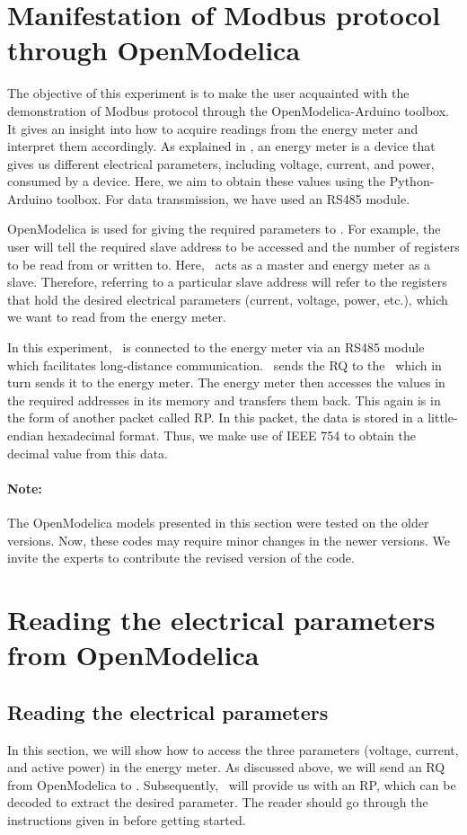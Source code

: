
\section{Manifestation of Modbus protocol through OpenModelica}
The objective of this experiment is to make the user acquainted with
the demonstration of Modbus protocol through the OpenModelica-Arduino toolbox.
It gives an insight into how to acquire readings from the energy meter and interpret them accordingly. As explained in ,
an energy meter is a device that gives us different electrical parameters, including voltage, current, and power, consumed by a device. Here, we aim to obtain these values using the Python-Arduino toolbox. For data transmission, we have used an RS485 module.

OpenModelica is used for giving the required parameters to \arduino. For
example, the user will tell the required slave address to be accessed
and the number of registers to be read from or written to. Here,
\arduino\ acts as a master and energy meter as a slave. Therefore,
referring to a particular slave address will refer to the registers
that hold the desired electrical parameters (current, voltage, power, etc.), which we want to read from the energy meter.

In this experiment, \arduino\ is connected to the energy meter via an RS485 module which facilitates long-distance communication.
\scilab\ sends the RQ to the \arduino\, which in turn sends it to the
energy meter. The energy meter then accesses the values in the
required addresses in its memory and transfers them back. This again
is in the form of another packet called RP. In this packet, the data is stored in a little-endian hexadecimal format. Thus, we make use of IEEE 754 to obtain the decimal value from this data.

\paragraph{Note: } The OpenModelica models presented in this section were tested on the older versions. Now, these codes may require minor changes in
the newer versions. We invite the experts to contribute the revised version of the code.


\section{Reading the electrical parameters from OpenModelica}
\subsection{Reading the electrical parameters}
In this section, we will show how to access the three parameters (voltage, current, and active power) in the energy meter. As discussed above, we will send an RQ from OpenModelica to \arduino. Subsequently, \arduino\ will provide us with an RP, which can be decoded to extract the desired parameter. The reader should go through the instructions given in  before getting started.

